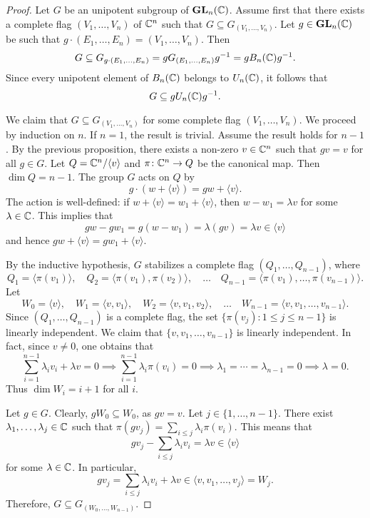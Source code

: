 \begin{proof}
    Let $G$ be an unipotent subgroup of $\mathbf{GL}_n(\mathbb{C})$. 
    Assume first that there exists
    a complete flag $(V_1,\dots,V_n)$ of $\mathbb{C}^n$
    such that $G\subseteq G_{(V_1,\dots,V_n)}$. Let $g\in\mathbf{GL}_n(\mathbb{C})$ be such that 
    $g\cdot (E_1,\dots,E_n)=(V_1,\dots,V_n)$. Then 
    \begin{gather*}
        G\subseteq G_{g\cdot (E_1,\dots,E_n)}
        =g G_{(E_1,\dots,E_n)}g^{-1}=gB_n(\mathbb{C})g^{-1}.
    \end{gather*}
    Since every unipotent element of $B_n(\mathbb{C})$ 
    belongs to $U_n(\mathbb{C})$, it follows that 
    \[
    G\subseteq gU_n(\mathbb{C})g^{-1}.
    \]
    
    We claim that $G\subseteq G_{(V_1,\dots,V_n)}$ for
    some complete flag $(V_1,\dots,V_n)$. We proceed by induction on $n$. If $n=1$, the result is trivial. Assume the result holds for 
    $n-1$. By the previous proposition, there exists a non-zero $v\in\mathbb{C}^n$ 
    such that $gv=v$ for all $g\in G$. Let $Q=\mathbb{C}^n/\langle v\rangle$ and $\pi\colon \mathbb{C}^n\to Q$ be the canonical map. Then $\dim Q=n-1$. The group $G$ 
    acts on $Q$ by
    \[
    g\cdot (w+\langle v\rangle)=gw+\langle v\rangle.
    \]
    The action is well-defined: if $w+\langle v\rangle=w_1+\langle v\rangle$, then 
    $w-w_1=\lambda v$ for some $\lambda\in\mathbb{C}$. This implies
    that 
    \[
    gw-gw_1=g(w-w_1)=\lambda(gv)=\lambda v\in \langle v\rangle
    \]
    and hence $gw+\langle v\rangle=gw_1+\langle v\rangle$. 
    
    By the inductive hypothesis, $G$ stabilizes
    a complete flag $(Q_1,\dots,Q_{n-1})$, where
    \[
    Q_1=\langle\pi(v_1)\rangle,
    \quad
    Q_2=\langle\pi(v_1),\pi(v_2)\rangle,
    \quad
    \dots
    \quad
    Q_{n-1}=\langle\pi(v_1),\dots,\pi(v_{n-1})\rangle.
    \]
    Let 
    \[
    W_0=\langle v\rangle,
    \quad
    W_1=\langle v,v_1\rangle,
    \quad
    W_2=\langle v,v_1,v_2\rangle,
    \quad\dots\quad 
    W_{n-1}=\langle v,v_1,\dots,v_{n-1}\rangle.
    \]
    Since $(Q_1,\dots,Q_{n-1})$ is a complete flag, 
    the set $\{\pi(v_j):1\leq j\leq n-1\}$ is linearly
    independent. We claim that 
    $\{v,v_1,\dots,v_{n-1}\}$ is linearly independent. In fact, since $v\ne 0$, one obtains that 
    \[
    \sum_{i=1}^{n-1}\lambda_iv_i+\lambda v=0
    \implies
    \sum_{i=1}^{n-1}\lambda_i\pi(v_i)=0
    \implies 
    \lambda_1=\cdots=\lambda_{n-1}=0
    \implies
    \lambda=0.
    \]
    Thus $\dim W_i=i+1$ for all $i$. 
    
    Let $g\in G$. 
    Clearly, 
    $gW_0\subseteq W_0$, as $gv=v$. Let $j\in\{1,\dots,n-1\}$.
    There exist $\lambda_1,\dots,\lambda_j\in\mathbb{C}$ 
    such that 
    $\pi(gv_j)=\sum_{i\leq j}\lambda_i\pi(v_i)$. This means
    that 
    \[
    gv_j-\sum_{i\leq j}\lambda_iv_i=\lambda v\in\langle v\rangle
    \]
    for some $\lambda\in\mathbb{C}$. In particular, 
    \[
    gv_j=\sum_{i\leq j}\lambda_iv_i+\lambda v\in\langle v,v_1,\dots,v_{j}\rangle=W_j.
    \]
    Therefore, $G\subseteq G_{(W_0,\dots,W_{n-1})}$. 
\end{proof}

